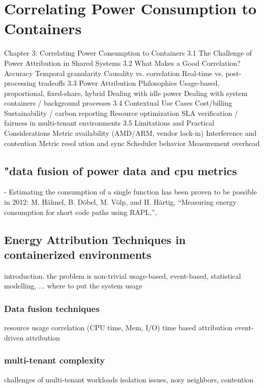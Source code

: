 \chapter{Correlating Power Consumption to Containers} %
\label{Chapter3}


Chapter 3: Correlating Power Consumption to Containers
    3.1 The Challenge of Power Attribution in Shared Systems
    3.2 What Makes a Good Correlation?
        Accuracy
        Temporal granularity
        Causality vs. correlation
        Real-time vs. post-processing tradeoffs
    3.3 Power Attribution Philosophies
        Usage-based, proportional, fixed-share, hybrid
        Dealing with idle power
        Dealing with system containers / background processes
    3.4 Contextual Use Cases
        Cost/billing
        Sustainability / carbon reporting
        Resource optimization
        SLA verification / fairness in multi-tenant environments
    3.5 Limitations and Practical Considerations
        Metric availability (AMD/ARM, vendor lock-in)
        Interference and contention
        Metric resol ution and sync
        Scheduler behavior
        Measurement overhead




\section{"data fusion of power data and cpu metrics}
- Estimating the consumption of a single function has been proven to be possible in 2012: M. Hähnel, B. Döbel, M. Völp, and H. Härtig, “Measuring energy consumption for short code paths using RAPL,”, \parencite{hahnel2012measuring}

\section{Energy Attribution Techniques in containerized environments}
    introduction. the problem is non-trivial
    usage-based, event-based, statistical modelling, ...
    where to put the system usage

\subsection{Data fusion techniques}
    resource usage correlation (CPU time, Mem, I/O)
    time based attribution
    event-driven attribution

\subsection{multi-tenant complexity}
    challenges of multi-tenant workloads
    isolation issues, nosy neighbors, contention
